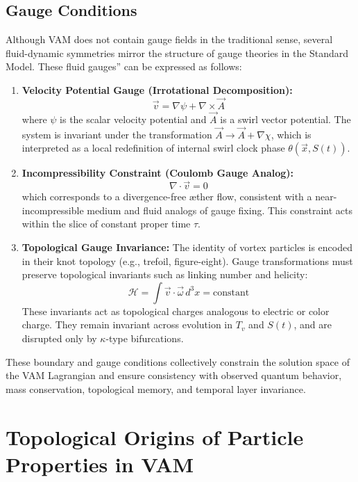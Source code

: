 \documentclass[12pt]{article}
\begin{document}
\subsection{Gauge Conditions}

Although VAM does not contain gauge fields in the traditional sense, several fluid-dynamic symmetries mirror the structure of gauge theories in the Standard Model. These \grqq fluid gauges\textquotedblright{} can be expressed as follows:

\begin{enumerate}
    \item \textbf{Velocity Potential Gauge (Irrotational Decomposition):}
    \[
        \vec{v} = \nabla \psi + \nabla \times \vec{A}
    \]
    where $\psi$ is the scalar velocity potential and $\vec{A}$ is a swirl vector potential. The system is invariant under the transformation $\vec{A} \to \vec{A} + \nabla \chi$, which is interpreted as a local redefinition of internal swirl clock phase $\theta(\vec{x}, S(t))$.

    \item \textbf{Incompressibility Constraint (Coulomb Gauge Analog):}
    \[
        \nabla \cdot \vec{v} = 0
    \]
    which corresponds to a divergence-free \ae{}ther flow, consistent with a near-incompressible medium and fluid analogs of gauge fixing. This constraint acts within the slice of constant proper time $\tau$.

    \item \textbf{Topological Gauge Invariance:}
    The identity of vortex particles is encoded in their knot topology (e.g., trefoil, figure-eight). Gauge transformations must preserve topological invariants such as linking number and helicity:
    \[
        \mathcal{H} = \int \vec{v} \cdot \vec{\omega} \, d^3x = \text{constant}
    \]
    These invariants act as topological charges analogous to electric or color charge. They remain invariant across evolution in $T_v$ and $S(t)$, and are disrupted only by $\kappa$-type bifurcations.
\end{enumerate}

These boundary and gauge conditions collectively constrain the solution space of the VAM Lagrangian and ensure consistency with observed quantum behavior, mass conservation, topological memory, and temporal layer invariance.
\section{Topological Origins of Particle Properties in VAM}
\end{document}
